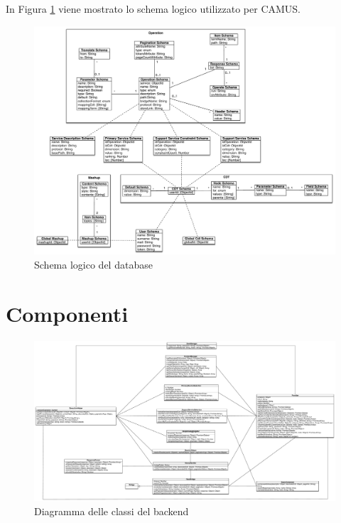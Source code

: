 In Figura \ref{fig:schema-logico-db} viene mostrato lo schema logico utilizzato per CAMUS.

\begin{figure}[!t]
	\centering
	\includegraphics[width=\textwidth]{5-implementazione-backend/Immagini/schema_logico_db.pdf}
	\caption{Schema logico del database}\label{fig:schema-logico-db}
\end{figure}

\section{Componenti\label{sec:componenti-backend}}

\begin{figure}[p]
	\centering
	\includegraphics[height=\textwidth, width=\textheight, angle=90]{5-implementazione-backend/Immagini/diagramma_classi_backend.pdf}
	\caption{Diagramma delle classi del backend}\label{fig:class-diagram-backend}
\end{figure}

